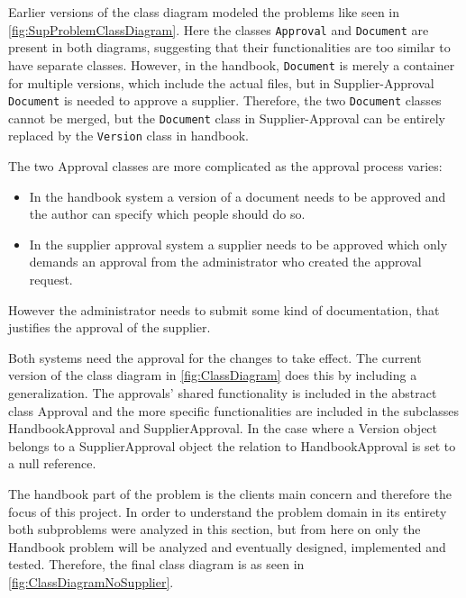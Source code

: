 Earlier versions of the class diagram modeled the problems like seen in \cref{fig:SupProblemClassDiagram}. 
Here the classes \texttt{Approval} and \texttt{Document} are present in both diagrams, suggesting that their functionalities are too similar to have separate classes.
However, in the handbook, \texttt{Document} is merely a container for multiple versions, which include the actual files, but in Supplier-Approval \texttt{Document} is needed to approve a supplier.
Therefore, the two \texttt{Document} classes cannot be merged, but the \texttt{Document} class in Supplier-Approval can be entirely replaced by the \texttt{Version} class in handbook.

The two Approval classes are more complicated as the approval process varies:
\begin{itemize}
  \item In the handbook system a version of a document needs to be approved and the author can specify which people should do so.
  \item In the supplier approval system a supplier needs to be approved which only demands an approval from the administrator who created the approval request.
\end{itemize}

However the administrator needs to submit some kind of documentation, that justifies the approval of the supplier.

Both systems need the approval for the changes to take effect.
The current version of the class diagram in \cref{fig:ClassDiagram} does this by including a generalization. The approvals' shared functionality is included in the abstract class Approval and the more specific functionalities are included in the subclasses HandbookApproval and SupplierApproval.
In the case where a Version object belongs to a SupplierApproval object the relation to HandbookApproval is set to a null reference.


The handbook part of the problem is the clients main concern and therefore the focus of this project.
In order to understand the problem domain in its entirety both subproblems were analyzed in this section, but from here on  only the Handbook problem will be analyzed and eventually designed, implemented and tested.
Therefore, the final class diagram is as seen in \cref{fig:ClassDiagramNoSupplier}.

